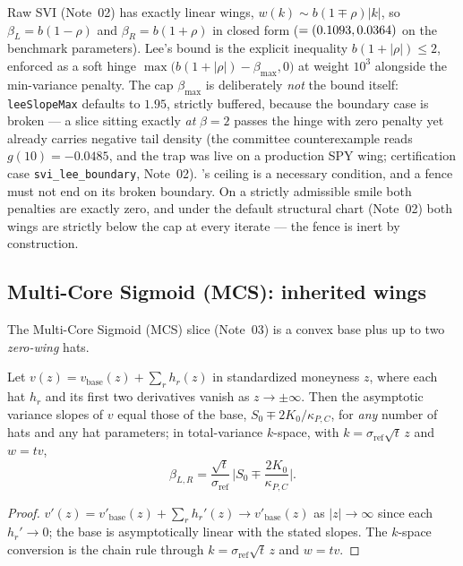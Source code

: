 \documentclass[11pt]{article}
\begin{document}
Raw SVI (Note~02) has exactly linear wings, $w(k)\sim b(1\mp\rho)|k|$, so
$\beta_L=b(1-\rho)$ and $\beta_R=b(1+\rho)$ in closed form
($=(0.1093,0.0364)$ on the benchmark parameters). Lee's bound is
the explicit inequality $b(1+|\rho|)\le2$, enforced as a soft hinge
$\max\big(b(1+|\rho|)-\beta_{\max},0\big)$ at weight $10^3$ alongside the
min-variance penalty. The cap $\beta_{\max}$ is deliberately \emph{not} the
bound itself: \texttt{leeSlopeMax} defaults to $1.95$, strictly buffered,
because the boundary case is broken --- a slice sitting exactly \emph{at}
$\beta=2$ passes the hinge with zero penalty yet already carries negative
tail density (the committee counterexample reads $g(10)=-0.0485$, and the
trap was live on a production SPY wing; certification case
\texttt{svi\_lee\_boundary}, Note~02). 's ceiling is a
necessary condition, and a fence must not end on its broken boundary. On a
strictly admissible smile both penalties are exactly zero, and under the
default structural chart (Note~02) both wings are strictly below the cap at
every iterate --- the fence is inert by construction.

\subsection{Multi-Core Sigmoid (MCS): inherited wings}

The Multi-Core Sigmoid (MCS) slice (Note~03) is a convex base plus up to two
\emph{zero-wing} hats.

\begin{proposition}
\label{prop:zerowing}
Let $v(z)=v_{\text{base}}(z)+\sum_r h_r(z)$ in standardized moneyness $z$,
where each hat $h_r$ and its first two derivatives vanish as
$z\to\pm\infty$. Then the asymptotic variance slopes of $v$ equal those of
the base, $S_0\mp2K_0/\kappa_{P,C}$, for \emph{any} number of hats and any
hat parameters; in total-variance $k$-space, with
$k=\sigma_{\text{ref}}\sqrt t\,z$ and $w=tv$,
\begin{equation}
\beta_{L,R}
=\frac{\sqrt t}{\sigma_{\text{ref}}}\,
\Big|S_0\mp\frac{2K_0}{\kappa_{P,C}}\Big|.
\label{eq:siv_wings}
\end{equation}
\end{proposition}

\begin{proof}
$v'(z)=v'_{\text{base}}(z)+\sum_rh_r'(z)\to v'_{\text{base}}(z)$ as
$|z|\to\infty$ since each $h_r'\to0$; the base is asymptotically linear with
the stated slopes. The $k$-space conversion is the chain rule through
$k=\sigma_{\text{ref}}\sqrt t\,z$ and $w=tv$.
\end{proof}
\end{document}
